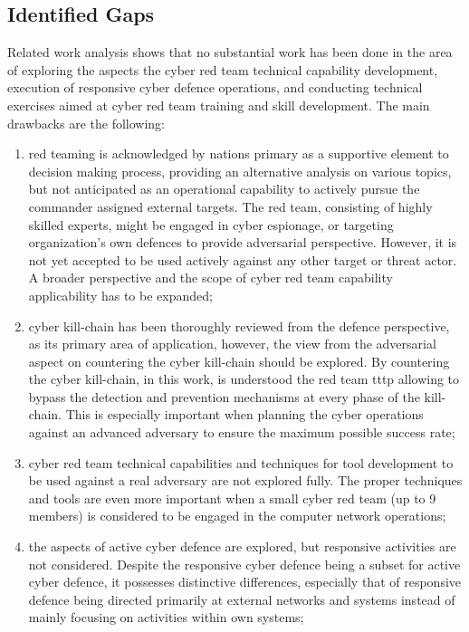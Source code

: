 \subsection{Identified Gaps}
\glsresetall
Related work analysis shows that no substantial work has been done in the area of exploring the aspects the cyber red team technical capability development, execution of responsive cyber defence operations, and conducting technical exercises aimed at cyber red team training and skill development.
The main drawbacks are the following:
\begin{enumerate}
    \item red teaming is acknowledged by nations primary as a supportive element to decision making process, providing an alternative analysis on various topics, but not anticipated as an operational capability to actively pursue the commander assigned external targets. The red team, consisting of highly skilled experts, might be engaged in cyber espionage, or targeting organization's own defences to provide adversarial perspective. However, it is not yet accepted to be used actively against any other target or threat actor. A broader perspective and the scope of cyber red team capability applicability has to be expanded;
    \item cyber kill-chain has been thoroughly reviewed from the defence perspective, as its primary area of application, however, the view from the adversarial aspect on countering the cyber kill-chain should be explored. By countering the cyber kill-chain, in this work, is understood the red team \gls{tttp} allowing to bypass the detection and prevention mechanisms at every phase of the kill-chain. This is especially important when planning the cyber operations against an advanced adversary to ensure the maximum possible success rate;
    \item cyber red team technical capabilities and techniques for tool development to be used against a real adversary are not explored fully. The proper techniques and tools are even more important when a small cyber red team (up to 9 members) is considered to be engaged in the computer network operations;
    \item the aspects of active cyber defence are explored, but responsive activities are not considered. Despite the responsive cyber defence being a subset for active cyber defence, it possesses distinctive differences, especially that of responsive defence being directed primarily at external networks and systems instead of mainly focusing on activities within own systems;

\end{enumerate}
